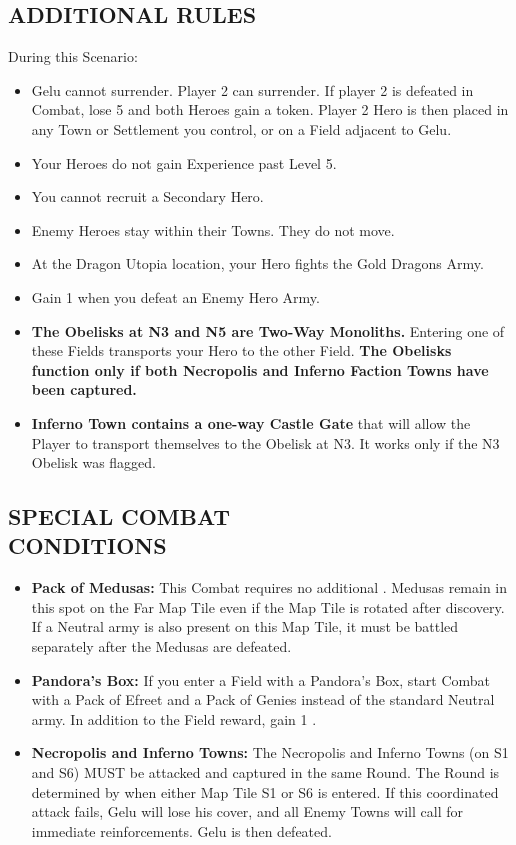 \begin{multicols*}{2}
\subsection*{\MakeUppercase{Additional Rules}}

During this Scenario:

\begin{itemize}
    \item Gelu cannot surrender.
      Player 2 can surrender.
      If player 2 is defeated in Combat, lose 5  and both Heroes gain a  token.
      Player 2 Hero is then placed in any Town or Settlement you control, or on a Field adjacent to Gelu.
    \item Your Heroes do not gain Experience past Level 5.
    \item You cannot recruit a Secondary Hero.
    \item Enemy Heroes stay within their Towns. They do not move.
    \item At the Dragon Utopia location, your Hero fights the Gold Dragons Army.
    \item Gain 1  when you defeat an Enemy Hero Army.
    \item \textbf{The Obelisks at N3 and N5 are Two-Way Monoliths.}
      Entering one of these Fields transports your Hero to the other Field. \textbf{The Obelisks function only if both Necropolis and Inferno Faction Towns have been captured.}
    \item \textbf{Inferno Town contains a one-way Castle Gate} that will allow the Player to transport themselves to the Obelisk at N3. It works only if the N3 Obelisk was flagged.
\end{itemize}

\subsection*{\MakeUppercase{Special Combat\\Conditions}}

\begin{itemize}
  \item \textbf{Pack of Medusas:} This Combat requires no additional .
    Medusas remain in this spot on the Far Map Tile even if the Map Tile is rotated after discovery.
    If a Neutral army is also present on this Map Tile, it must be battled separately after the Medusas are defeated.
  \item \textbf{Pandora's Box:} If you enter a Field with a Pandora's Box, start Combat with a Pack of Efreet and a Pack of Genies instead of the standard Neutral army.
    In addition to the Field reward, gain 1 .
  \item \textbf{Necropolis and Inferno Towns:} The Necropolis and Inferno Towns (on S1 and S6) MUST be attacked and captured in the same Round.
    The Round is determined by when either Map Tile S1 or S6 is entered.
    If this coordinated attack fails, Gelu will lose his cover, and all Enemy Towns will call for immediate reinforcements.
    Gelu is then defeated.
\end{itemize}


\end{multicols*}
